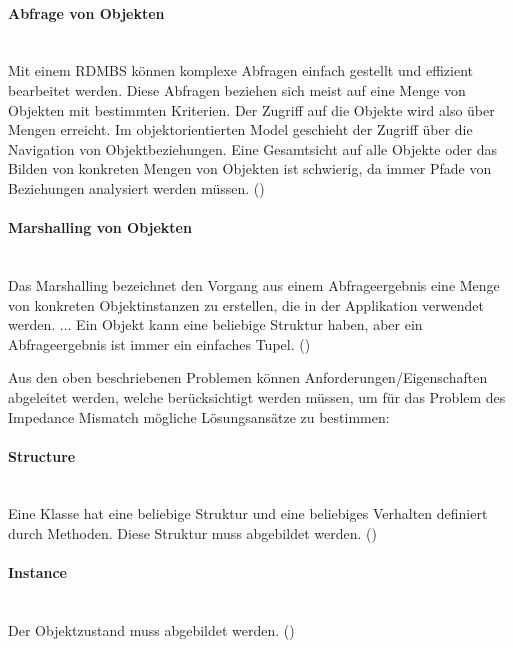 \paragraph{Abfrage von Objekten} \hspace{0pt} \\
Mit einem RDMBS können komplexe Abfragen einfach gestellt und effizient bearbeitet werden. Diese Abfragen beziehen sich meist auf eine Menge von Objekten mit bestimmten Kriterien. Der Zugriff auf die Objekte wird also über Mengen erreicht. Im objektorientierten Model geschieht der Zugriff über die Navigation von Objektbeziehungen. Eine Gesamtsicht auf alle Objekte oder das Bilden von konkreten Mengen von Objekten ist schwierig, da immer Pfade von Beziehungen analysiert werden müssen. (\cite[S. 4]{Sche1})

\paragraph{Marshalling von Objekten} \hspace{0pt} \\
Das Marshalling bezeichnet den Vorgang aus einem Abfrageergebnis eine Menge von konkreten Objektinstanzen zu erstellen, die in der Applikation verwendet werden. ... Ein Objekt kann eine beliebige Struktur haben, aber ein Abfrageergebnis ist immer ein einfaches Tupel. (\cite[S. 4]{Sche1})

\hspace{1pt}

\noindent 
Aus den oben beschriebenen Problemen können Anforderungen/Eigenschaften abgeleitet werden, welche berücksichtigt werden müssen, um für das Problem des Impedance Mismatch mögliche Lösungsansätze zu bestimmen:

\paragraph{Structure} \hspace{0pt} \\
Eine Klasse hat eine beliebige Struktur und eine beliebiges Verhalten definiert durch Methoden. Diese Struktur muss abgebildet werden. (\cite[S. 4]{Sche1})

\paragraph{Instance} \hspace{0pt} \\
Der Objektzustand muss abgebildet werden. (\cite[S. 4]{Sche1})

